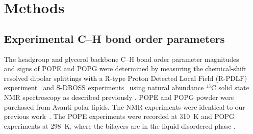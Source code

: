 \documentclass[aps,prl,superscriptaddress,twocolumn]{revtex4}
\begin{document}



\section{Methods}
\subsection{Experimental C--H bond order parameters}
The headgroup and glycerol backbone C--H bond order parameter magnitudes and signs of POPE and POPG
were determined by measuring the chemical-shift resolved dipolar splittings
with a R-type Proton Detected Local Field (R-PDLF) experiment~\cite{dvinskikh04} and
S-DROSS experiments~\cite{gross97} using natural abundance $^{13}$C solid state NMR spectroscopy
as described previously \cite{ferreira13,ferreira16}.
POPE and POPG powder were purchased from Avanti polar lipids.
The NMR experiments were identical to our previous work~\cite{antila19}.
The POPE experiments were recorded at 310~K and POPG experiments at 298~K, where the bilayers are in the liquid disordered phase \cite{marsh13}.
\end{document}
